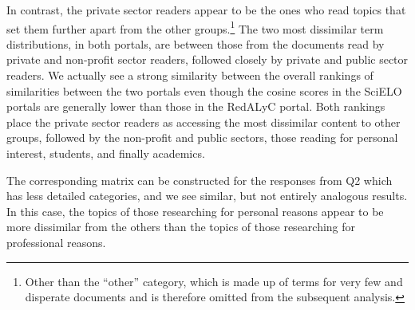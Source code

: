 In contrast, the private sector readers appear to be the ones who read topics that set them further apart from the other groups.\footnote{Other than the ``other'' category, which is made up of terms for very few and disperate documents and is therefore omitted from the subsequent analysis.} The two most dissimilar term distributions, in both portals, are between those from the documents read by private and non-profit sector readers, followed closely by private and public sector readers. We actually see a strong similarity between the overall rankings of similarities between the two portals even though the cosine scores in the SciELO portals are generally lower than those in the RedALyC portal. Both rankings place the private sector readers as accessing the most dissimilar content to other groups, followed by the non-profit and public sectors, those reading for personal interest, students, and finally academics.

The corresponding matrix can be constructed for the responses from Q2 which has less detailed categories, and we see similar, but not entirely analogous results. In this case, the topics of those researching for personal reasons appear to be more dissimilar from the others than the topics of those researching for professional reasons.

